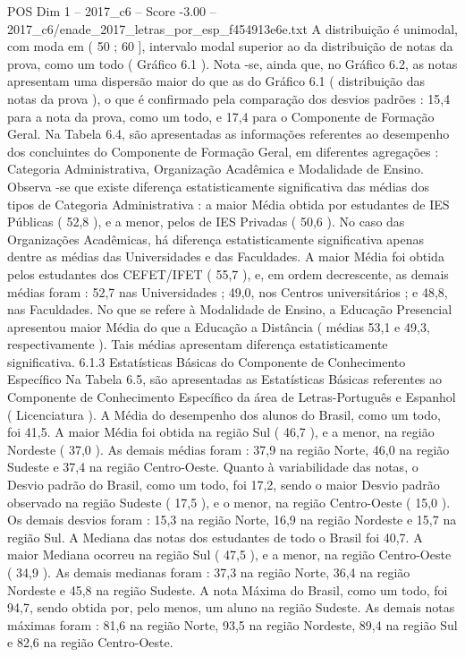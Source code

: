 \begin{textsample}{POS Dim 1 – 2017\_c6 – Score -3.00 – 2017\_c6/enade\_2017\_letras\_por\_esp\_f454913e6e.txt}
A distribuição é unimodal, com moda em ( 50 ; 60 ], intervalo modal superior ao da distribuição de notas da prova, como um todo ( Gráfico 6.1 ).
Nota -se, ainda que, no Gráfico 6.2, as notas apresentam uma dispersão maior do que as do Gráfico 6.1 ( distribuição das notas da prova ), o que é confirmado pela comparação dos desvios padrões : 15,4 para a nota da prova, como um todo, e 17,4 para o Componente de Formação Geral.
Na Tabela 6.4, são apresentadas as informações referentes ao desempenho dos concluintes do Componente de Formação Geral, em diferentes agregações : Categoria Administrativa, Organização Acadêmica e Modalidade de Ensino.
Observa -se que existe diferença estatisticamente significativa das médias dos tipos de Categoria Administrativa : a maior Média obtida por estudantes de IES Públicas ( 52,8 ), e a menor, pelos de IES Privadas ( 50,6 ).
No caso das Organizações Acadêmicas, há diferença estatisticamente significativa apenas dentre as médias das Universidades e das Faculdades.
A maior Média foi obtida pelos estudantes dos CEFET/IFET ( 55,7 ), e, em ordem decrescente, as demais médias foram : 52,7 nas Universidades ; 49,0, nos Centros universitários ; e 48,8, nas Faculdades.
No que se refere à Modalidade de Ensino, a Educação Presencial apresentou maior Média do que a Educação a Distância ( médias 53,1 e 49,3, respectivamente ).
Tais médias apresentam diferença estatisticamente significativa. 6.1.3 Estatísticas Básicas do Componente de Conhecimento Específico Na Tabela 6.5, são apresentadas as Estatísticas Básicas referentes ao Componente de Conhecimento Específico da área de Letras-Português e Espanhol ( Licenciatura ).
A Média do desempenho dos alunos do Brasil, como um todo, foi 41,5.
A maior Média foi obtida na região Sul ( 46,7 ), e a menor, na região Nordeste ( 37,0 ).
As demais médias foram : 37,9 na região Norte, 46,0 na região Sudeste e 37,4 na região Centro-Oeste.
Quanto à variabilidade das notas, o Desvio padrão do Brasil, como um todo, foi 17,2, sendo o maior Desvio padrão observado na região Sudeste ( 17,5 ), e o menor, na região Centro-Oeste ( 15,0 ).
Os demais desvios foram : 15,3 na região Norte, 16,9 na região Nordeste e 15,7 na região Sul.
A Mediana das notas dos estudantes de todo o Brasil foi 40,7.
A maior Mediana ocorreu na região Sul ( 47,5 ), e a menor, na região Centro-Oeste ( 34,9 ).
As demais medianas foram : 37,3 na região Norte, 36,4 na região Nordeste e 45,8 na região Sudeste.
A nota Máxima do Brasil, como um todo, foi 94,7, sendo obtida por, pelo menos, um aluno na região Sudeste.
As demais notas máximas foram : 81,6 na região Norte, 93,5 na região Nordeste, 89,4 na região Sul e 82,6 na região Centro-Oeste.

\end{textsample}
